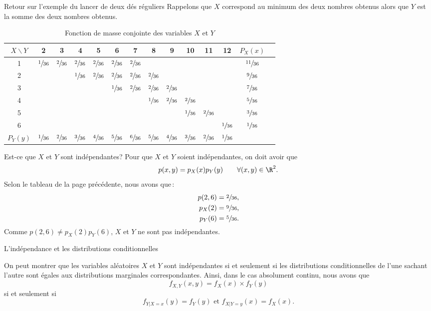 \documentclass[nuit,charter,pied]{BeamerJS}
\begin{document}
\begin{frame}[t]{Retour sur l'exemple du lancer de deux dés réguliers}
	Rappelons que $X$ correspond au minimum des deux nombres obtenus alors que $Y$ est la somme des deux nombres obtenus.
	
	\begin{table}[h!]
\centering\footnotesize\setlength{\tabcolsep}{4pt}
\begin{tabular}{c c c c c c c c c c c c c c}
\toprule
$X \backslash Y$ & 2 & 3 & 4 & 5 & 6 & 7 & 8 & 9 & 10 & 11 & 12 & $P_X(x)$ \\
\midrule
1 & $\sfrac{1}{36}$ & $\sfrac{2}{36}$ & $\sfrac{2}{36}$ & $\sfrac{2}{36}$ & $\sfrac{2}{36}$ & $\sfrac{2}{36}$ & &  &  &  &  & $\sfrac{11}{36}$ \\
2 & &  & $\sfrac{1}{36}$ & $\sfrac{2}{36}$ & $\sfrac{2}{36}$ & $\sfrac{2}{36}$ & $\sfrac{2}{36}$ & & & & & $\sfrac{9}{36}$ \\
3 & & & &  & $\sfrac{1}{36}$ & $\sfrac{2}{36}$ & $\sfrac{2}{36}$ &$\sfrac{2}{36}$ & & & & $\sfrac{7}{36}$ \\
4 & & & &  &  &  & $\sfrac{1}{36}$ & $\sfrac{2}{36}$ & $\sfrac{2}{36}$ & & & $\sfrac{5}{36}$ \\
5 & & & & &  &  & & & $\sfrac{1}{36}$ & $\sfrac{2}{36}$ & & $\sfrac{3}{36}$ \\
6 & & & & & &  & & & & &$\sfrac{1}{36}$ & $\sfrac{1}{36}$ \\
\midrule
$P_Y(y)$ & $\sfrac{1}{36}$ & $\sfrac{2}{36}$ & $\sfrac{3}{36}$ & $\sfrac{4}{36}$ & $\sfrac{5}{36}$ & $\sfrac{6}{36}$ & $\sfrac{5}{36}$ & $\sfrac{4}{36}$ & $\sfrac{3}{36}$ & $\sfrac{2}{36}$ & $\sfrac{1}{36}$ & \\
\bottomrule
\end{tabular}
\caption{Fonction de masse conjointe des variables $X$ et $Y$}
\end{table}
\end{frame}
\begin{frame}[t]{Est-ce que $X$ et $Y$ sont indépendantes?}
	Pour que $X$ et $Y$ soient indépendantes, on doit avoir que
	\[p(x,y)=p_X(x)p_Y(y)\qquad\forall (x,y)\in\R^2.\]
	Selon le tableau de la page précédente, nous avons que\,:
	\begin{align*}
	p(2,6)&=\sfrac{2}{36},\\
	p_X(2)&=\sfrac{9}{36},\\
	p_Y(6)&=\sfrac{5}{36}.
	\end{align*}
	Comme $p(2,6)\neq p_X(2)p_Y(6)$, $X$ et $Y$ ne sont pas indépendantes.
\end{frame}
\begin{frame}[t]{L'indépendance et les distributions conditionnelles}
	\begin{rem}
		On peut montrer que les variables aléatoires $X$ et $Y$ sont indépendantes si et seulement si les distributions conditionnelles de l'une sachant l'autre sont égales aux distributions marginales correspondantes. Ainsi, dans le cas absolument continu, nous avons que
		\[f_{X,Y}(x,y)=f_X(x)\times f_Y(y)\]
		si et seulement si
		\[f_{Y|X=x}(y)=f_Y(y)\text{~et~} f_{X|Y=y}(x)=f_X(x).\]
	\end{rem}
\end{frame}
\end{document}
